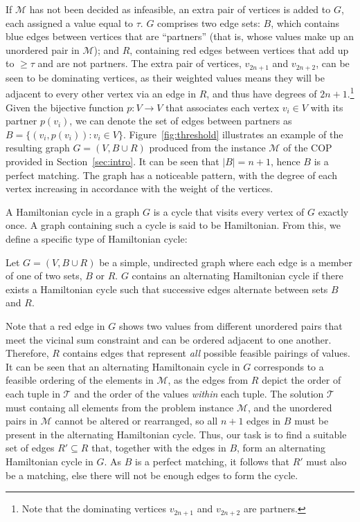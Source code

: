 \documentclass{elsarticle}
\begin{document}
If $\mathcal{M}$ has not been decided as infeasible, an extra pair of vertices is added to $G$, each assigned a value equal to $\tau$. $G$ comprises two edge sets: $B$, which contains blue edges between vertices that are ``partners'' (that is, whose values make up an unordered pair in $\mathcal{M}$); and $R$, containing red edges between vertices that add up to $\geq \tau$ and are not partners. The extra pair of vertices, $v_{2n+1}$ and $v_{2n+2}$, can be seen to be dominating vertices, as their weighted values means they will be adjacent to every other vertex via an edge in $R$, and thus have degrees of $2n+1$.\footnote{Note that the dominating vertices $v_{2n+1}$ and $v_{2n+2}$ are partners.} Given the bijective function $p : V \to V$ that associates each vertex $v_i \in V$ with its partner $p(v_i)$, we can denote the set of edges between partners as $B = \{(v_i, p(v_i)) : v_i \in V\}$. Figure~\ref{fig:threshold} illustrates an example of the resulting graph $G = (V, B \cup R)$ produced from the instance $\mathcal{M}$ of the COP provided in Section~\ref{sec:intro}. It can be seen that $|B| = n+1$, hence $B$ is a perfect matching. The graph has a noticeable pattern, with the degree of each vertex increasing in accordance with the weight of the vertices.

A Hamiltonian cycle in a graph $G$ is a cycle that visits every vertex of $G$ exactly once. A graph containing such a cycle is said to be Hamiltonian. From this, we define a specific type of Hamiltonian cycle:

\begin{definition} %
	\label{defn:althamcycle}
	Let $G = (V, B \cup R)$ be a simple, undirected graph where each edge is a member of one of two sets, $B$ or $R$. $G$ contains an alternating Hamiltonian cycle if there exists a Hamiltonian cycle such that successive edges alternate between sets $B$ and $R$.
\end{definition}

\noindent Note that a red edge in $G$ shows two values from different unordered pairs that meet the vicinal sum constraint and can be ordered adjacent to one another. Therefore, $R$ contains edges that represent \emph{all} possible feasible pairings of values. It can be seen that an alternating Hamiltonain cycle in $G$ corresponds to a feasible ordering of the elements in $\mathcal{M}$, as the edges from $R$ depict the order of each tuple in $\mathcal{T}$ and the order of the values \emph{within} each tuple. The solution $\mathcal{T}$ must containg all elements from the problem instance $\mathcal{M}$, and the unordered pairs in $\mathcal{M}$ cannot be altered or rearranged, so all $n+1$ edges in $B$ must be present in the alternating Hamiltonian cycle. Thus, our task is to find a suitable set of edges $R' \subseteq R$ that, together with the edges in $B$, form an alternating Hamiltonian cycle in $G$. As $B$ is a perfect matching, it follows that $R'$ must also be a matching, else there will not be enough edges to form the cycle.
\end{document}
